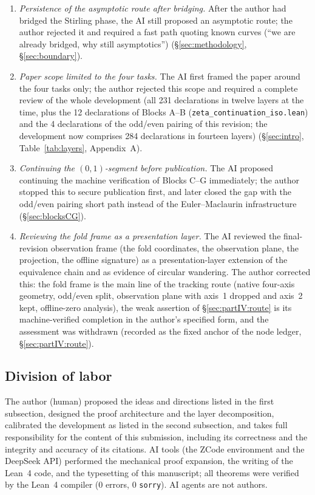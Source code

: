 \documentclass{article}
\begin{document}
\begin{enumerate}
\item \emph{Persistence of the asymptotic route after bridging.} After the
author had bridged the Stirling phase, the AI still proposed an asymptotic
route; the author rejected it and required a fast path quoting known curves
(``we are already bridged, why still asymptotics'')
(\S\ref{sec:methodology}, \S\ref{sec:boundary}).
\item \emph{Paper scope limited to the four tasks.} The AI first framed the
paper around the four tasks only; the author rejected this scope and
required a complete review of the whole development (all 231 declarations
in twelve layers at the time, plus the 12 declarations of Blocks A--B
(\texttt{zeta\_continuation\_iso.lean}) and the 4 declarations of the
odd/even pairing of this
revision; the development now comprises 284 declarations in fourteen
layers) (\S\ref{sec:intro}, Table~\ref{tab:layers},
Appendix~A).
\item \emph{Continuing the $(0,1)$-segment before publication.} The AI
proposed continuing the machine verification of Blocks C--G immediately;
the author stopped this to secure publication first, and later closed the
gap with the odd/even pairing short path instead of the Euler--Maclaurin
infrastructure (\S\ref{sec:blocksCG}).
\item \emph{Reviewing the fold frame as a presentation layer.} The AI
reviewed the final-revision observation frame (the fold coordinates, the
observation plane, the projection, the offline signature) as a
presentation-layer extension of the equivalence chain and as evidence of
circular wandering. The author corrected this: the fold frame is the main
line of the tracking route (native four-axis geometry, odd/even split,
observation plane with axis~1 dropped and axis~2 kept, offline-zero
analysis), the weak assertion of \S\ref{sec:partIV:route} is its
machine-verified completion in the author's specified form, and the
assessment was withdrawn (recorded as the fixed anchor of the node ledger,
\S\ref{sec:partIV:route}).
\end{enumerate}

\subsection*{Division of labor}
The author (human) proposed the ideas and directions listed in the first
subsection, designed the proof architecture and the layer decomposition,
calibrated the development as listed in the second subsection, and takes
full responsibility for the content of this submission, including its
correctness and the integrity and accuracy of its citations. AI tools (the
ZCode environment and the DeepSeek API) performed the
mechanical proof expansion, the writing of
the Lean~4 code, and the typesetting of this manuscript; all theorems were
verified by the Lean~4 compiler (0 errors, 0 \texttt{sorry}). AI agents are
not authors.
\end{document}

